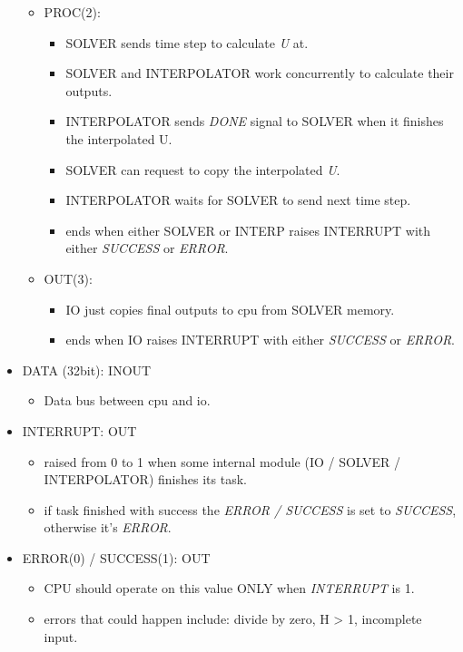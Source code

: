 \documentclass[12pt]{report}
\begin{document}
\begin{itemize}
\begin{itemize}
\begin{itemize}
        \end{itemize}
        \item PROC(2):
        \begin{itemize}
            \item SOLVER sends time step to calculate \emph{U} at.
            \item SOLVER and INTERPOLATOR work concurrently to calculate their outputs.
            \item INTERPOLATOR sends \emph{DONE} signal to SOLVER when it finishes the interpolated U.
            \item SOLVER can request to copy the interpolated \emph{U}.
            \item INTERPOLATOR waits for SOLVER to send next time step.
            \item ends when either SOLVER or INTERP raises INTERRUPT with either \emph{SUCCESS} or \emph{ERROR}.
        \end{itemize}
        \item OUT(3):
        \begin{itemize}
            \item IO just copies final outputs to cpu from SOLVER memory.
            \item ends when IO raises INTERRUPT with either \emph{SUCCESS} or \emph{ERROR}.
        \end{itemize}
    \end{itemize}
    \item DATA (32bit): INOUT
    \begin{itemize}
        \item Data bus between cpu and io.
    \end{itemize}
    \item INTERRUPT: OUT
    \begin{itemize}
        \item raised from 0 to 1 when some internal module (IO / SOLVER / INTERPOLATOR) finishes its task.
        \item if task finished with success the \emph{ERROR / SUCCESS} is set to \emph{SUCCESS}, otherwise it's \emph{ERROR}.
    \end{itemize}
    \item ERROR(0) / SUCCESS(1): OUT
    \begin{itemize}
        \item CPU should operate on this value ONLY when \emph{INTERRUPT} is 1.
        \item errors that could happen include: divide by zero, H > 1, incomplete input.
    \end{itemize}
\end{itemize}
\end{document}
